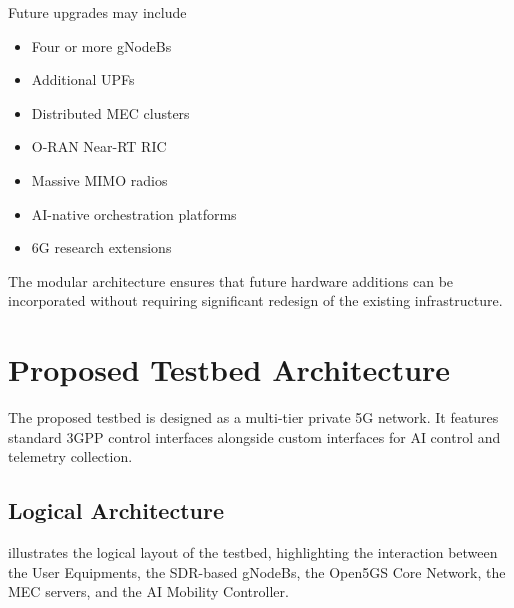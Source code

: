\documentclass[12pt,a4paper]{article}\usepackage[a4paper,margin=1in]{geometry}\usepackage{graphicx}\usepackage{longtable}\usepackage{booktabs}\usepackage{hyperref}\usepackage{enumitem}\usepackage{amsmath}\usepackage{tikz}\usepackage{pgfgantt}\usepackage{setspace}\setstretch{1.15}\usetikzlibrary{positioning,arrows.meta,shapes.geometric}
\begin{document}
	Future upgrades may include
	
	\begin{itemize}
		
		\item Four or more gNodeBs
		
		\item Additional UPFs
		
		\item Distributed MEC clusters
		
		\item O-RAN Near-RT RIC
		
		\item Massive MIMO radios
		
		\item AI-native orchestration platforms
		
		\item 6G research extensions
		
	\end{itemize}
	
	The modular architecture ensures that future hardware additions can be incorporated without requiring significant redesign of the existing infrastructure.
	
	\section{Proposed Testbed Architecture}
	
	The proposed testbed is designed as a multi-tier private 5G network. It features standard 3GPP control interfaces alongside custom interfaces for AI control and telemetry collection.
	
	\subsection{Logical Architecture} illustrates the logical layout of the testbed, highlighting the interaction between the User Equipments, the SDR-based gNodeBs, the Open5GS Core Network, the MEC servers, and the AI Mobility Controller.
	
\end{document}
